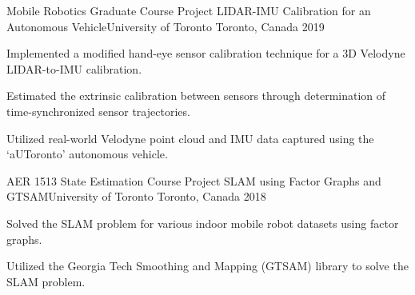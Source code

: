 

\begin{cventries}

  \cventry
    {Mobile Robotics Graduate Course Project} %
    {LIDAR-IMU Calibration for an Autonomous Vehicle{\enskip\cdotp\enskip}University of Toronto} %
    {Toronto, Canada} %
    {2019} %
    {
      \begin{cvitems} %
        \item {Implemented a modified hand-eye sensor calibration technique for a 3D Velodyne LIDAR-to-IMU calibration.}
        \item {Estimated the extrinsic calibration between sensors through determination of time-synchronized sensor trajectories.}
        \item {Utilized real-world Velodyne point cloud and IMU data captured using the `aUToronto' autonomous vehicle.}
      \end{cvitems}
    }
    
  \cventry
    {AER 1513 State Estimation Course Project} %
    {SLAM using Factor Graphs and GTSAM{\enskip\cdotp\enskip}University of Toronto} %
    {Toronto, Canada} %
    {2018} %
    {
      \begin{cvitems} %
        \item {Solved the SLAM problem for various indoor mobile robot datasets using factor graphs.}
        \item {Utilized the Georgia Tech Smoothing and Mapping (GTSAM) library to solve the SLAM problem.}
      \end{cvitems}
    }

\end{cventries}

